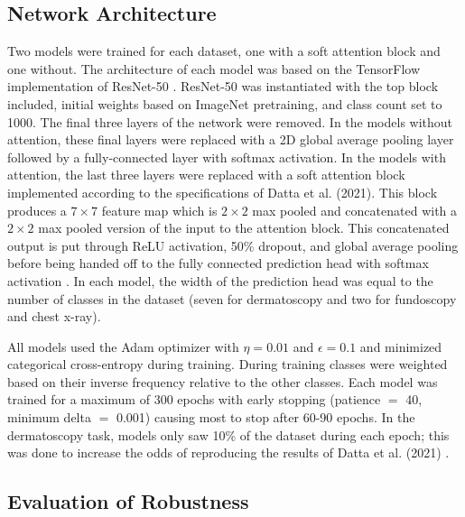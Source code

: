 \documentclass[10pt,twocolumn,letterpaper]{article}
\begin{document}
    \subsection{Network Architecture}
      Two models were trained for each dataset, one with a soft attention block and one without. The architecture of each model was based on the TensorFlow \cite{TensorFlow} implementation of ResNet-50 \cite{ResNetImplementation}. ResNet-50 was instantiated with the top block included, initial weights based on ImageNet \cite{ImageNet} pretraining, and class count set to 1000. The final three layers of the network were removed. In the models without attention, these final layers were replaced with a 2D global average pooling layer followed by a fully-connected layer with softmax activation. In the models with attention, the last three layers were replaced with a soft attention block implemented according to the specifications of Datta et al. (2021). This block produces a $7 \times 7$ feature map which is $2 \times 2$ max pooled and concatenated with a $2 \times 2$ max pooled version of the input to the attention block. This concatenated output is put through ReLU activation, 50\% dropout, and global average pooling before being handed off to the fully connected prediction head with softmax activation \cite{AttentionSkinCancerClassification}. In each model, the width of the prediction head was equal to the number of classes in the dataset (seven for dermatoscopy and two for fundoscopy and chest x-ray).

      All models used the Adam optimizer with $\eta=0.01$ and $\epsilon=0.1$ and minimized categorical cross-entropy during training. During training classes were weighted based on their inverse frequency relative to the other classes. Each model was trained for a maximum of 300 epochs with early stopping (patience $=$ 40, minimum delta $=$ 0.001) causing most to stop after 60-90 epochs. In the dermatoscopy task, models only saw 10\% of the dataset during each epoch; this was done to increase the odds of reproducing the results of Datta et al. (2021) \cite{AttentionSkinCancerClassification}.

  \subsection{Evaluation of Robustness}

{\small


}
\end{document}
